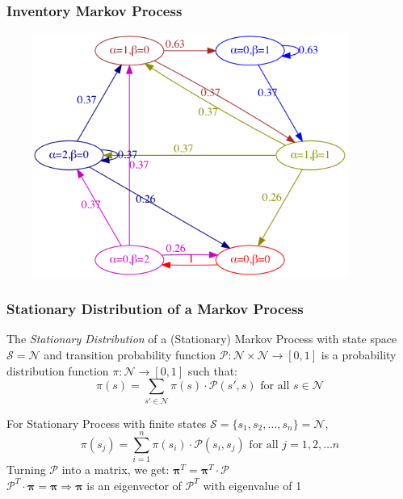 \documentclass[handout]{beamer}
\begin{document}
\begin{frame}
\frametitle{Inventory Markov Process}
\includegraphics[width=12cm, height=8cm]{simple_inv_mp.png}
\end{frame}

\begin{frame}
\frametitle{Stationary Distribution of a Markov Process}
\pause
\begin{definition} 
 The {\em Stationary Distribution} of a (Stationary) Markov Process with state space $\mathcal{S} = \mathcal{N}$ and transition probability function $\mathcal{P}: \mathcal{N} \times \mathcal{N} \rightarrow [0, 1]$ is a probability distribution function $\pi: \mathcal{N} \rightarrow [0, 1]$ such that:
  $$\pi(s) = \sum_{s'\in \mathcal{N}} \pi(s) \cdot \mathcal{P}(s', s) \text{ for all } s \in \mathcal{N}$$
\end{definition}
\pause
For Stationary Process with finite states $\mathcal{S} = \{s_1, s_2, \ldots, s_n\} = \mathcal{N}$,
$$\pi(s_j) = \sum_{i=1}^n \pi(s_i) \cdot \mathcal{P}(s_i, s_j) \text{ for all } j = 1, 2, \ldots n$$
\pause
Turning $\mathcal{P}$ into a matrix, we get: $\bm{\pi}^T = \bm{\pi}^T \cdot \bm{\mathcal{P}}$\\
\pause
$\bm{\mathcal{P}}^T \cdot \bm{\pi}= \bm{\pi} \Rightarrow \bm{\pi}$ is an eigenvector of $\bm{\mathcal{P}}^T$ with eigenvalue of 1
\end{frame}
\end{document}
